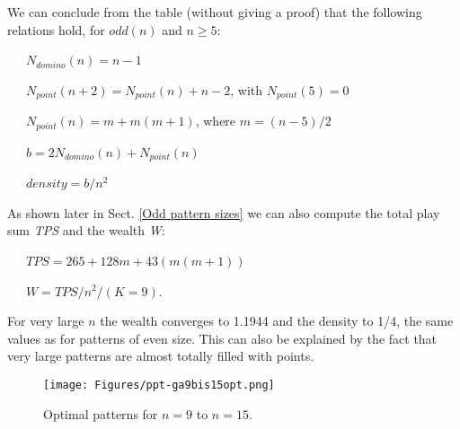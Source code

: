 \documentclass[10pt,a4paper]{article}  %
\begin{document}
We can conclude  from the table (without giving a proof) that the following relations hold, for
$odd(n)$ and $n\geq 5$:

~~~$N_{domino}(n)=n-1$

~~~$N_{point}(n+2) = N_{point}(n)  + n-2$, with $N_{point}(5)=0$ 

~~~$N_{point}(n)= m+m(m+1)$, where $m= (n-5)/2$

~~~$b=2 N_{domino}(n) + N_{point}(n)$

~~~$density = b/n^2$

As shown later in Sect. 
\ref{Odd pattern sizes}
 we can also compute the total play sum \textit{TPS}
and the wealth \textit{W}:

~~~$\textit{TPS} = 265 + 128m + 43(m(m + 1))$

~~~$W= \textit{TPS}/n^2/(K=9)$.

For very large $n$ the wealth converges to 1.1944 and the density to 1/4,
the same values as for patterns of even size. 
This can also be explained by the fact that very large patterns are almost totally filled with points.  

\begin{figure}[H] 
\centering

\texttt{[image: Figures/ppt-ga9bis15opt.png]}

\caption{
Optimal patterns for $n=9$ to $n=15$. 
}
\label{ppt-ga9bis15opt}
\end{figure}
\end{document}
